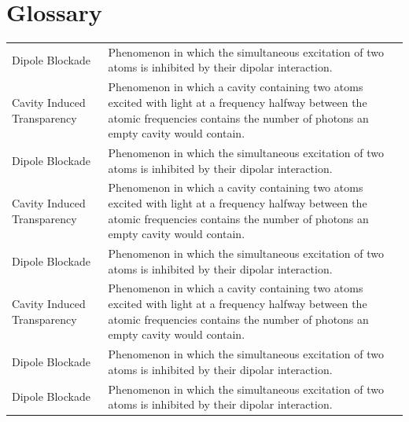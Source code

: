 \chapter*{Glossary}

\setlength\LTleft{-5pt} %

\begin{longtable}{l p{}}
    Dipole Blockade             & Phenomenon in which the simultaneous excitation of two atoms is inhibited by their dipolar interaction.                                                                                  \\
    Cavity Induced Transparency & Phenomenon in which a cavity containing two atoms excited with light at a frequency halfway between the atomic frequencies contains the number of photons an empty cavity would contain. \\
    Dipole Blockade             & Phenomenon in which the simultaneous excitation of two atoms is inhibited by their dipolar interaction.                                                                                  \\
    Cavity Induced Transparency & Phenomenon in which a cavity containing two atoms excited with light at a frequency halfway between the atomic frequencies contains the number of photons an empty cavity would contain. \\
    Dipole Blockade             & Phenomenon in which the simultaneous excitation of two atoms is inhibited by their dipolar interaction.                                                                                  \\
    Cavity Induced Transparency & Phenomenon in which a cavity containing two atoms excited with light at a frequency halfway between the atomic frequencies contains the number of photons an empty cavity would contain. \\
    Dipole Blockade             & Phenomenon in which the simultaneous excitation of two atoms is inhibited by their dipolar interaction.                                                                                  \\
    Dipole Blockade             & Phenomenon in which the simultaneous excitation of two atoms is inhibited by their dipolar interaction.                                                                                  \\

\end{longtable}
